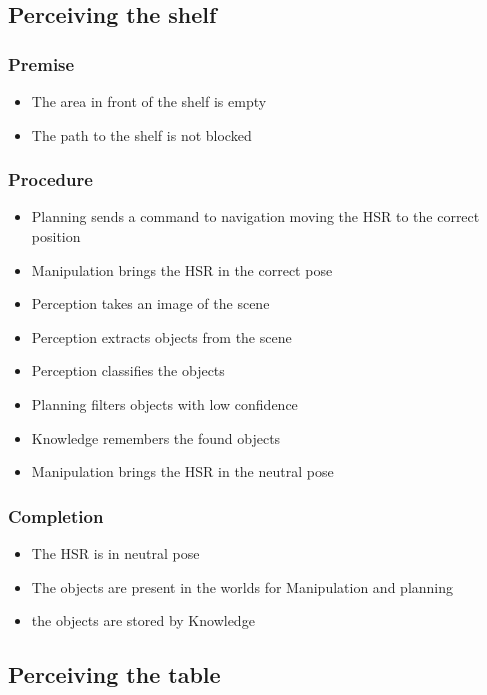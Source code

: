 \documentclass[main.tex]{subfiles}
\begin{document}
	\subsection{Perceiving the shelf}
	
	\subsubsection{Premise}
	\begin{itemize}
		\item The area in front of the shelf is empty 
		\item The path to the shelf is not blocked
	\end{itemize} 
	
	\subsubsection{Procedure}
	\begin{itemize}			
		\item Planning sends a command to navigation moving the HSR to the correct position
		\item Manipulation brings the HSR in the correct pose
		\item Perception takes an image of the scene
		\item Perception extracts objects from the scene
		\item Perception classifies the objects	
		\item Planning filters objects with low confidence
		\item Knowledge remembers the found objects
		\item Manipulation brings the HSR in the neutral pose	 				
	\end{itemize}
	
	\subsubsection{Completion}
	\begin{itemize}
		\item The HSR is in neutral pose
		\item The objects are present in the worlds for Manipulation and planning
		\item the objects are stored by Knowledge				
	\end{itemize}
	
	\subsection{Perceiving the table}
	
\end{document}
